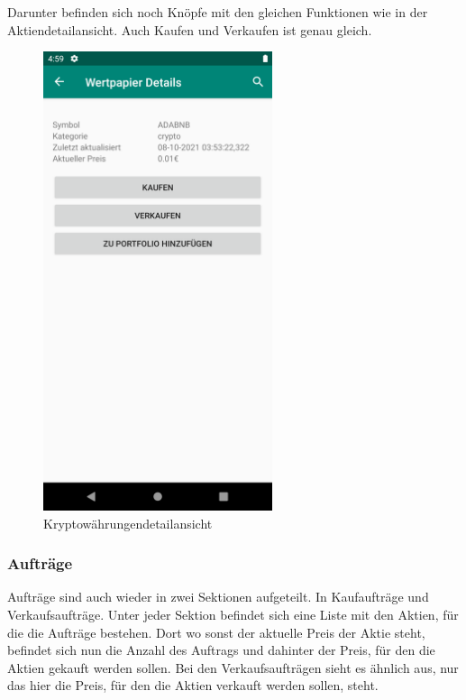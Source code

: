 \documentclass[10pt]{scrartcl}
\begin{document}
Darunter befinden sich noch Knöpfe mit den gleichen Funktionen wie in der Aktiendetailansicht. Auch Kaufen und Verkaufen ist genau gleich.

\begin{figure}[H]
	\centering
	\includegraphics[width=0.6\textwidth]{Bilder/Applikation/krypto.png}
	\caption{Kryptowährungendetailansicht}
\end{figure}

\subsubsection{Aufträge}

Aufträge sind auch wieder in zwei Sektionen aufgeteilt. In Kaufaufträge und Verkaufsaufträge. Unter jeder Sektion befindet sich eine Liste mit den Aktien, für die die Aufträge bestehen. Dort wo sonst der aktuelle Preis der Aktie steht, befindet sich nun die Anzahl des Auftrags und dahinter der Preis, für den die Aktien gekauft werden sollen. Bei den Verkaufsaufträgen sieht es ähnlich aus, nur das hier die Preis, für den die Aktien verkauft werden sollen, steht.
\end{document}

